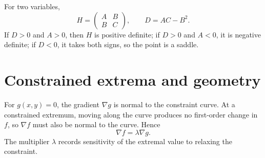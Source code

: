 For two variables,
\[
  H=\begin{pmatrix}A&B\\B&C\end{pmatrix},\qquad D=AC-B^2.
\]
If $D>0$ and $A>0$, then $H$ is positive definite; if $D>0$ and $A<0$, it is negative definite; if $D<0$, it takes both signs, so the point is a saddle.

\section{Constrained extrema and geometry}

For $g(x,y)=0$, the gradient $\nabla g$ is normal to the constraint curve.  At a constrained extremum, moving along the curve produces no first-order change in $f$, so $\nabla f$ must also be normal to the curve.  Hence
\[
  \nabla f=\lambda\nabla g.
\]
The multiplier $\lambda$ records sensitivity of the extremal value to relaxing the constraint.
